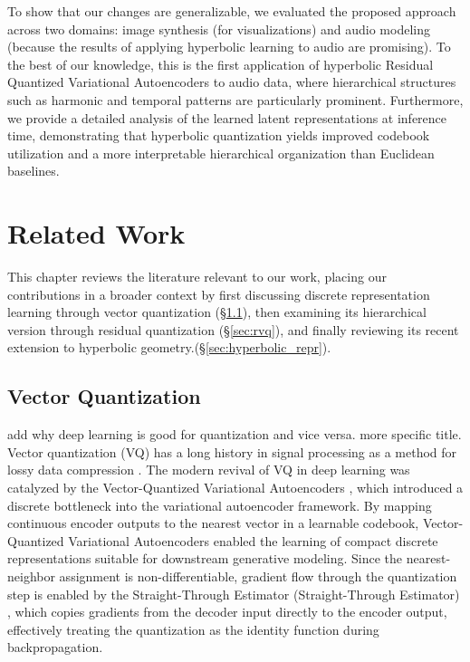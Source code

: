 \documentclass[12pt]{report}
\begin{document}
To show that our changes are generalizable, we evaluated the proposed approach across two domains: image synthesis (for visualizations) and audio modeling (because the results of applying hyperbolic learning to audio are promising). To the best of our knowledge, this is the first application of hyperbolic Residual Quantized Variational Autoencoders to audio data, where hierarchical structures such as harmonic and temporal patterns are particularly prominent. Furthermore, we provide a detailed analysis of the learned latent representations at inference time, demonstrating that hyperbolic quantization yields improved codebook utilization and a more interpretable hierarchical organization than Euclidean baselines.

\chapter{Related Work}

This chapter reviews the literature relevant to our work, placing our contributions in a broader context by first discussing discrete representation learning through vector quantization (\S\ref{sec:vq}), then examining its hierarchical version through residual quantization (\S\ref{sec:rvq}), and finally reviewing its recent extension to hyperbolic geometry.(\S\ref{sec:hyperbolic_repr}).

\section{Vector Quantization}
\label{sec:vq}
add why deep learning is good for quantization and vice versa. more specific title.
Vector quantization (VQ) has a long history in signal processing as a method for lossy data compression \cite{originalvq}. The modern revival of VQ in deep learning was catalyzed by the Vector-Quantized Variational Autoencoders \cite{vqvae}, which introduced a discrete bottleneck into the variational autoencoder framework. By mapping continuous encoder outputs to the nearest vector in a learnable codebook, Vector-Quantized Variational Autoencoders enabled the learning of compact discrete representations suitable for downstream generative modeling. Since the nearest-neighbor assignment is non-differentiable, gradient flow through the quantization step is enabled by the Straight-Through Estimator (Straight-Through Estimator) \cite{straight_through_estimator}, which copies gradients from the decoder input directly to the encoder output, effectively treating the quantization as the identity function during backpropagation.
\end{document}
